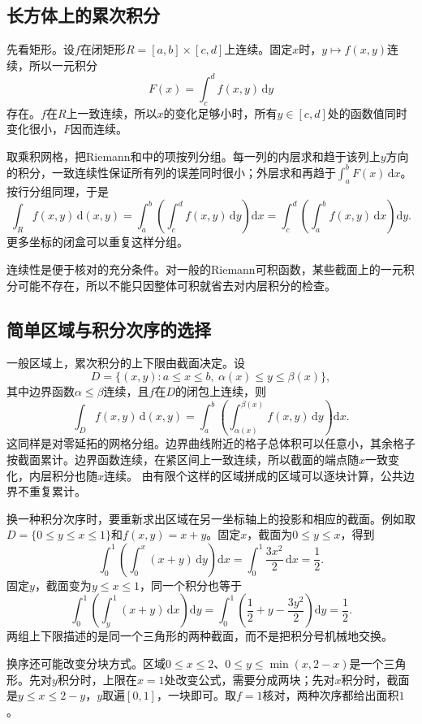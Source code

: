\subsection{长方体上的累次积分}

先看矩形。设$f$在闭矩形$R=[a,b]\times[c,d]$上连续。固定$x$时，$y\mapsto f(x,y)$连续，所以一元积分
\[
 F(x)=\int_c^d f(x,y)\,\mathrm dy
\]
存在。$f$在$R$上一致连续，所以$x$的变化足够小时，所有$y\in[c,d]$处的函数值同时变化很小，$F$因而连续。

取乘积网格，把Riemann和中的项按列分组。每一列的内层求和趋于该列上$y$方向的积分，一致连续性保证所有列的误差同时很小；外层求和再趋于$\int_a^bF(x)\,\mathrm dx$。按行分组同理，于是
\[
 \int_R f(x,y)\,\mathrm d(x,y)
 =\int_a^b\left(\int_c^d f(x,y)\,\mathrm dy\right)\mathrm dx
 =\int_c^d\left(\int_a^b f(x,y)\,\mathrm dx\right)\mathrm dy.
\]
更多坐标的闭盒可以重复这样分组。

连续性是便于核对的充分条件。对一般的Riemann可积函数，某些截面上的一元积分可能不存在，所以不能只因整体可积就省去对内层积分的检查。

\subsection{简单区域与积分次序的选择}

一般区域上，累次积分的上下限由截面决定。设
\[
 D=\{(x,y):a\leq x\leq b,\ \alpha(x)\leq y\leq\beta(x)\},
\]
其中边界函数$\alpha\leq\beta$连续，且$f$在$D$的闭包上连续，则
\[
 \int_D f(x,y)\,\mathrm d(x,y)
 =\int_a^b\left(\int_{\alpha(x)}^{\beta(x)}f(x,y)\,\mathrm dy\right)\mathrm dx.
\]
这同样是对零延拓的网格分组。边界曲线附近的格子总体积可以任意小，其余格子按截面累计。边界函数连续，在紧区间上一致连续，所以截面的端点随$x$一致变化，内层积分也随$x$连续。
由有限个这样的区域拼成的区域可以逐块计算，公共边界不重复累计。

换一种积分次序时，要重新求出区域在另一坐标轴上的投影和相应的截面。例如取$D=\{0\leq y\leq x\leq1\}$和$f(x,y)=x+y$。固定$x$，截面为$0\leq y\leq x$，得到
\[
 \int_0^1\left(\int_0^x(x+y)\,\mathrm dy\right)\mathrm dx
 =\int_0^1\frac{3x^2}{2}\,\mathrm dx=\frac12.
\]
固定$y$，截面变为$y\leq x\leq1$，同一个积分也等于
\[
 \int_0^1\left(\int_y^1(x+y)\,\mathrm dx\right)\mathrm dy
 =\int_0^1\left(\frac12+y-\frac{3y^2}{2}\right)\mathrm dy=\frac12.
\]
两组上下限描述的是同一个三角形的两种截面，而不是把积分号机械地交换。

换序还可能改变分块方式。区域$0\leq x\leq2$、$0\leq y\leq\min(x,2-x)$是一个三角形。先对$y$积分时，上限在$x=1$处改变公式，需要分成两块；先对$x$积分时，截面是$y\leq x\leq2-y$，$y$取遍$[0,1]$，一块即可。取$f=1$核对，两种次序都给出面积$1$。

